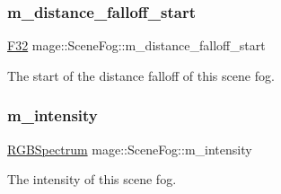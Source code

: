 \subsubsection{\texorpdfstring{m\+\_\+distance\+\_\+falloff\+\_\+start}{m\_distance\_falloff\_start}}
{\footnotesize\ttfamily \hyperlink{namespacemage_aa97e833b45f06d60a0a9c4fc22ae02c0}{F32} mage\+::\+Scene\+Fog\+::m\+\_\+distance\+\_\+falloff\+\_\+start\hspace{0.3cm}{\ttfamily [private]}}

The start of the distance falloff of this scene fog. \hypertarget{structmage_1_1_scene_fog_ad3758984c5a1941cd883dd82f8ebe975}{}\label{structmage_1_1_scene_fog_ad3758984c5a1941cd883dd82f8ebe975} 
\subsubsection{\texorpdfstring{m\+\_\+intensity}{m\_intensity}}
{\footnotesize\ttfamily \hyperlink{structmage_1_1_r_g_b_spectrum}{R\+G\+B\+Spectrum} mage\+::\+Scene\+Fog\+::m\+\_\+intensity\hspace{0.3cm}{\ttfamily [private]}}

The intensity of this scene fog. 